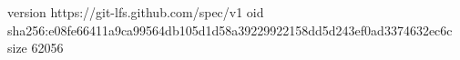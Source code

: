 version https://git-lfs.github.com/spec/v1
oid sha256:e08fe66411a9ca99564db105d1d58a39229922158dd5d243ef0ad3374632ec6c
size 62056
